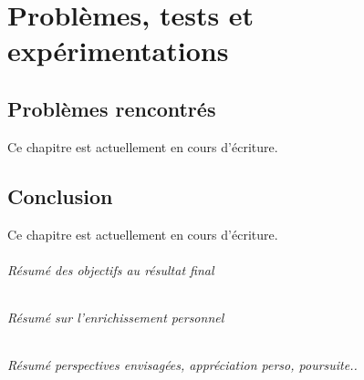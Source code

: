 \documentclass[
	headsepline=on,
	footsepline=on,
	twoside=off,
	abstract=on,
	DIV=10
]{scrreprt}
\begin{document}
	\part{Problèmes, tests et expérimentations}
	
		\chapter{Problèmes rencontrés}
		
		\begin{info}
			Ce chapitre est actuellement en cours d'écriture.
		\end{info}
%			
				
			
		\chapter{Conclusion}
		
		\begin{info}
			Ce chapitre est actuellement en cours d'écriture.
		\end{info}
		
			\paragraph{Résumé des objectifs au résultat final}
									
			\paragraph{Résumé sur l'enrichissement personnel}
						
			\paragraph{Résumé perspectives envisagées, appréciation perso, poursuite..}
		
\end{document}
